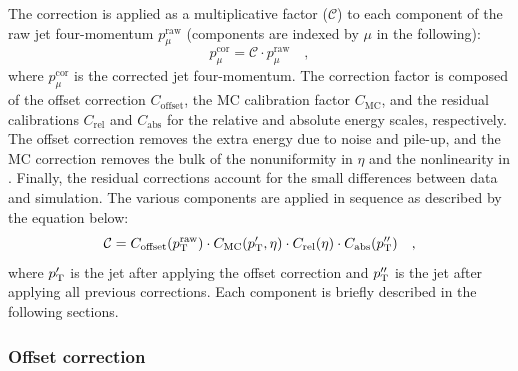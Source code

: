 The correction is applied as a multiplicative factor ($\mathcal{C}$) to each component of the raw jet four-momentum $p_\mu^\mathrm{raw}$ (components are indexed by $\mu$ in the following):
\begin{equation}
p_\mu^\mathrm{cor} = \mathcal{C}\cdot p_\mu^\mathrm{raw} \quad,
\end{equation}
where $p_\mu^\mathrm{cor}$ is the corrected jet four-momentum. The correction factor is composed of the offset correction $C_\mathrm{offset}$, the MC calibration factor $C_\mathrm{MC}$, and the residual calibrations $C_\mathrm{rel}$ and $C_\mathrm{abs}$ for the relative and absolute energy scales, respectively. The offset correction removes the extra energy due to noise and pile-up, and the MC correction removes the bulk of the nonuniformity in $\eta$ and the nonlinearity in \pt. Finally, the residual corrections account for the small differences between data and simulation. The various components are applied in sequence as described by the equation below:
\begin{equation}
\mathcal{C} = C_\mathrm{offset}(p_\mathrm{T}^\mathrm{raw}) \cdot C_\mathrm{MC}(p_\mathrm{T}',\eta) \cdot C_\mathrm{rel}(\eta) \cdot C_\mathrm{abs}(p_\mathrm{T}'') \quad ,
\end{equation}
where $p_\mathrm{T}'$ is the jet \pt after applying the offset correction and $p_\mathrm{T}''$ is the jet \pt after applying all previous corrections. Each component is briefly described in the following sections.

\subsubsection{Offset correction}
 
